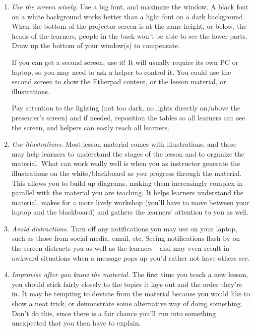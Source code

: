 \begin{enumerate}
\item
  \emph{Use the screen wisely.}  Use a big font, and maximize the
  window. A black font on a white background works better than a light
  font on a dark background. When the bottom of the projector screen
  is at the same height, or below, the heads of the learners, people
  in the back won't be able to see the lower parts. Draw up the bottom
  of your window(s) to compensate.

  If you can get a second screen, use it! It will usually require its
  own PC or laptop, so you may need to ask a helper to control it. You
  could use the second screen to show the Etherpad content, or the
  lesson material, or illustrations.

  Pay attention to the lighting (not too dark, no lights directly
  on/above the presenter's screen) and if needed, reposition the
  tables so all learners can see the screen, and helpers can easily
  reach all learners.

\item
  \emph{Use illustrations.}  Most lesson material comes with
  illustrations, and these may help learners to understand the stages
  of the lesson and to organize the material. What can work really
  well is when you as instructor generate the illustrations on the
  white/blackboard as you progress through the material. This allows
  you to build up diagrams, making them increasingly complex in
  parallel with the material you are teaching. It helps learners
  understand the material, makes for a more lively workshop (you'll
  have to move between your laptop and the blackboard) and gathers the
  learners' attention to you as well.

\item
  \emph{Avoid distractions.}  Turn off any notifications you may use
  on your laptop, such as those from social media, email, etc. Seeing
  notifications flash by on the screen distracts you as well as the
  learners - and may even result in awkward situations when a message
  pops up you'd rather not have others see.

\item
  \emph{Improvise after you know the material.}  The first time you
  teach a new lesson, you should stick fairly closely to the topics it
  lays out and the order they're in.  It may be tempting to deviate
  from the material because you would like to show a neat trick, or
  demonstrate some alternative way of doing something. Don't do this,
  since there is a fair chance you'll run into something unexpected
  that you then have to explain.


\end{enumerate}
